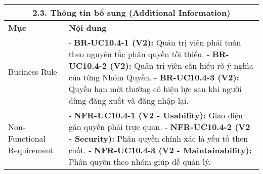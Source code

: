 \begin{longtable}{|m{4cm}|p{11cm}|}
\hline
\multicolumn{2}{|c|}{\textbf{2.3. Thông tin bổ sung (Additional Information)}} \\
\hline
\textbf{Mục} & \textbf{Nội dung} \\
\hline
Business Rule & - \textbf{BR-UC10.4-1 (V2):} Quản trị viên phải tuân theo nguyên tắc phân quyền tối thiểu. \newline - \textbf{BR-UC10.4-2 (V2):} Quản trị viên cần hiểu rõ ý nghĩa của từng Nhóm Quyền. \newline - \textbf{BR-UC10.4-3 (V2):} Quyền hạn mới thường có hiệu lực sau khi người dùng đăng xuất và đăng nhập lại. \\
\hline
Non-Functional Requirement & - \textbf{NFR-UC10.4-1 (V2 - Usability):} Giao diện gán quyền phải trực quan. \newline - \textbf{NFR-UC10.4-2 (V2 - Security):} Phân quyền chính xác là yếu tố then chốt. \newline - \textbf{NFR-UC10.4-3 (V2 - Maintainability):} Phân quyền theo nhóm giúp dễ quản lý. \\
\hline
\end{longtable}

